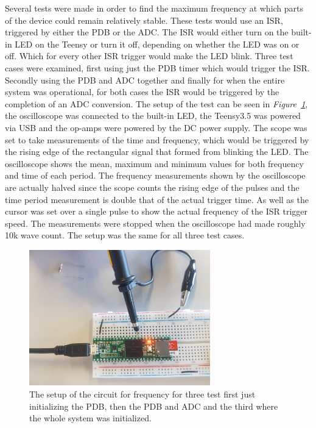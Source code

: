Several tests were made in order to find the maximum frequency at which parts of the device could remain relatively stable.
These tests would use an ISR, triggered by either the PDB or the ADC.
The ISR would either turn on the built-in LED on the Teensy or turn it off, depending on whether the LED was on or off.
Which for every other ISR trigger would make the LED blink.
Three test cases were examined, first using just the PDB timer which would trigger the ISR. 
Secondly using the PDB and ADC together and finally for when the entire system was operational, for both cases the ISR would be triggered by the completion of an ADC conversion.
The setup of the test can be seen in \textit{Figure~\ref{fig:SetupCircSpeed}}, the oscilloscope was connected to the built-in LED, the Teensy3.5 was powered via USB and the op-amps were powered by the DC power supply.
The scope was set to take measurements of the time and frequency, which would be triggered by the rising edge of the rectangular signal that formed from blinking the LED. 
The oscilloscope shows the mean, maximum and minimum values for both frequency and time of each period.
The frequency measurements shown by the oscilloscope are actually halved since the scope counts the rising edge of the pulses and the time period measurement is double that of the actual trigger time.
As well as the cursor was set over a single pulse to show the actual frequency of the ISR trigger speed.
The measurements were stopped when the oscilloscope had made roughly 10k wave count.
The setup was the same for all three test cases.


\begin{figure}[h]
    \centering
    \includegraphics[width=0.7\textwidth]{graphics/SetupCircSpeed.jpg}
    \caption{The setup of the circuit for frequency for three test first just initializing the PDB, then the PDB and ADC and the third where the whole system was initialized.}
    \label{fig:SetupCircSpeed}
\end{figure}

